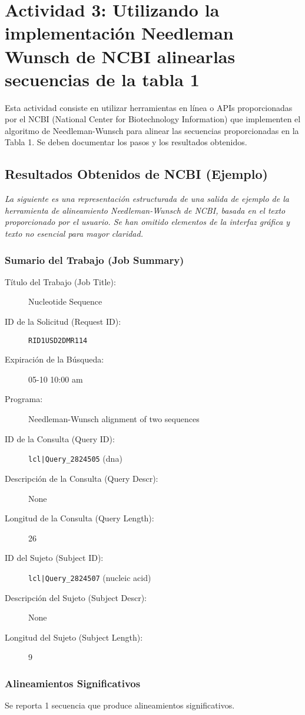 \documentclass[fleqn,10pt]{article}
\begin{document}
\section{Actividad 3: Utilizando la implementación Needleman Wunsch de NCBI alinearlas secuencias de la tabla 1}
Esta actividad consiste en utilizar herramientas en línea o APIs proporcionadas por el NCBI (National Center for Biotechnology Information) que implementen el algoritmo de Needleman-Wunsch para alinear las secuencias proporcionadas en la Tabla 1. Se deben documentar los pasos y los resultados obtenidos.

\subsection*{Resultados Obtenidos de NCBI (Ejemplo)}
\textit{La siguiente es una representación estructurada de una salida de ejemplo de la herramienta de alineamiento Needleman-Wunsch de NCBI, basada en el texto proporcionado por el usuario. Se han omitido elementos de la interfaz gráfica y texto no esencial para mayor claridad.}

\subsubsection*{Sumario del Trabajo (Job Summary)}
\begin{description}
    \item[Título del Trabajo (Job Title):] Nucleotide Sequence
    \item[ID de la Solicitud (Request ID):] \texttt{RID1USD2DMR114}
    \item[Expiración de la Búsqueda:] 05-10 10:00 am
    \item[Programa:] Needleman-Wunsch alignment of two sequences
    \item[ID de la Consulta (Query ID):] \texttt{lcl|Query\_2824505} (dna)
    \item[Descripción de la Consulta (Query Descr):] None
    \item[Longitud de la Consulta (Query Length):] 26
    \item[ID del Sujeto (Subject ID):] \texttt{lcl|Query\_2824507} (nucleic acid)
    \item[Descripción del Sujeto (Subject Descr):] None
    \item[Longitud del Sujeto (Subject Length):] 9
\end{description}

\subsubsection*{Alineamientos Significativos}
Se reporta 1 secuencia que produce alineamientos significativos.
\end{document}
